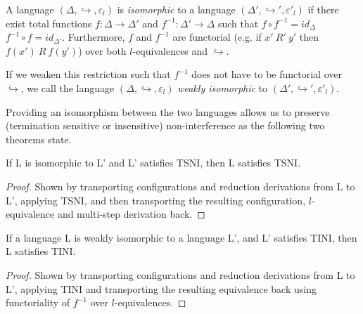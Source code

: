 \documentclass{sigplanconf}
\newcommand{\Varid}[1]{\mathit{#1}}
\begin{document}

\begin{definition}
  A language \ensuremath{(\Delta,\hookrightarrow,\varepsilon_{\Varid{l}})} is \textit{isomorphic} to a
  language \ensuremath{(\Delta',\hookrightarrow',\varepsilon'_{\Varid{l}})} if there exist total functions \ensuremath{\Varid{f}\mathbin{:}\Delta\rightarrow\Delta'} and \ensuremath{\Varid{f}^{-1}\mathbin{:}\Delta'\rightarrow\Delta} such that \ensuremath{\Varid{f}\circ\Varid{f}^{-1}\mathrel{=}id_{\Delta}} \ensuremath{\Varid{f}^{-1}\circ\Varid{f}\mathrel{=}id_{\Delta'}}.  Furthermore, \ensuremath{\Varid{f}} and \ensuremath{\Varid{f}^{-1}} are functorial (e.g. if
  $x'\ R'\ y'$ then $f(x')\ R\ f(y')$) over both
  $l$-equivalences and \ensuremath{\hookrightarrow}.
  
  If we weaken this restriction such that \ensuremath{\Varid{f}^{-1}} does
  not have to be functorial over \ensuremath{\hookrightarrow}, we call the
  language \ensuremath{(\Delta,\hookrightarrow,\varepsilon_{\Varid{l}})} \textit{weakly isomorphic} to
  \ensuremath{(\Delta',\hookrightarrow',\varepsilon'_{\Varid{l}})}.
\end{definition}

Providing an isomorphism between the two languages allows us to
preserve (termination sensitive or insensitive) non-interference
as the following two theorems state.

\begin{theorem}
  \label{thm:iso-tsni}
  If L is isomorphic to L' and L' satisfies TSNI, then
  L satisfies TSNI.
\end{theorem}

\begin{proof}
  Shown by transporting configurations and reduction derivations from
  L to L', applying TSNI, and then transporting the
  resulting configuration, $l$-equivalence and multi-step derivation back.
\end{proof}

\begin{theorem}
  \label{thm:iso-tini}
  If a language L is weakly isomorphic to a language L', and L'
  satisfies TINI, then L satisfies TINI.
\end{theorem}

\begin{proof}
  Shown by transporting configurations and reduction derivations
  from L to L', applying TINI and transporting the resulting
  equivalence back using functoriality of \ensuremath{\Varid{f}^{-1}} over $l$-equivalences.
\end{proof}
\end{document}
